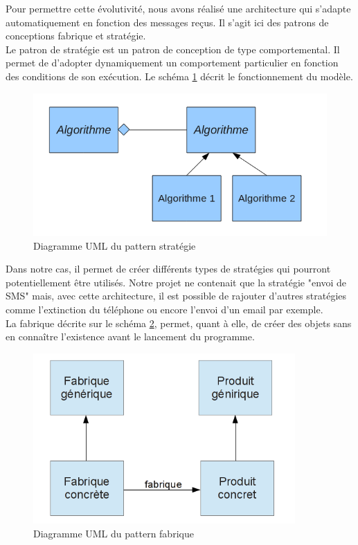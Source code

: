 Pour permettre cette évolutivité, nous avons réalisé une architecture qui s'adapte automatiquement en
fonction des messages reçus. Il s'agit ici des patrons de conceptions fabrique et stratégie. 
\\
 
 
Le patron de stratégie est un patron de conception de type comportemental. Il permet de d'adopter 
dynamiquement un comportement particulier en fonction des conditions de son exécution. Le schéma 
\ref{pattern_strategie} décrit le fonctionnement du modèle.
 
\begin{figure}[H]
  \center
  \includegraphics[width=12cm]{img/pattern_strategie.png}
  \caption{Diagramme UML du pattern stratégie}
  \label{pattern_strategie}
\end{figure}
 
Dans notre cas, il permet de créer différents types de stratégies qui pourront potentiellement être utilisés. 
Notre projet ne contenait que la stratégie "envoi de SMS" mais, avec cette architecture, il est possible 
de rajouter d'autres stratégies comme l'extinction du téléphone ou encore l'envoi d'un email par exemple.
\\
 
 
La fabrique décrite sur le schéma \ref{fabrique}, permet, quant à elle, de créer des objets sans en connaître l’existence avant le lancement du programme.
 
\begin{figure}[H]
  \center
  \includegraphics[width=10cm]{img/fabrique.png}
  \caption{Diagramme UML du pattern fabrique}
  \label{fabrique}
\end{figure}
 
